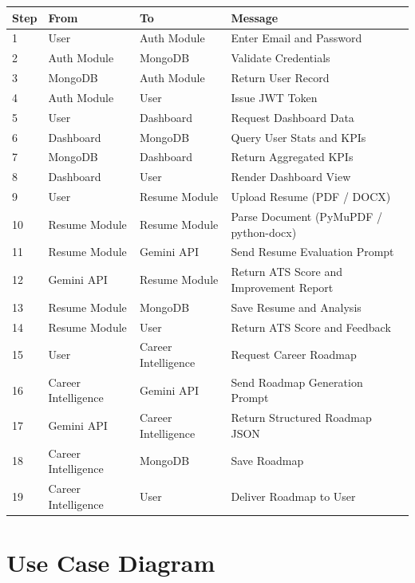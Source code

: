 \documentclass[12pt]{article}
\begin{document}
\begin{longtable}{|p{}|p{}|p{}|p{}|}
\hline
\textbf{Step} & \textbf{From} & \textbf{To} & \textbf{Message} \\ \hline
\endhead
1 & User & Auth Module & Enter Email and Password \\ \hline
2 & Auth Module & MongoDB & Validate Credentials \\ \hline
3 & MongoDB & Auth Module & Return User Record \\ \hline
4 & Auth Module & User & Issue JWT Token \\ \hline
5 & User & Dashboard & Request Dashboard Data \\ \hline
6 & Dashboard & MongoDB & Query User Stats and KPIs \\ \hline
7 & MongoDB & Dashboard & Return Aggregated KPIs \\ \hline
8 & Dashboard & User & Render Dashboard View \\ \hline
9 & User & Resume Module & Upload Resume (PDF / DOCX) \\ \hline
10 & Resume Module & Resume Module & Parse Document (PyMuPDF / python-docx) \\ \hline
11 & Resume Module & Gemini API & Send Resume Evaluation Prompt \\ \hline
12 & Gemini API & Resume Module & Return ATS Score and Improvement Report \\ \hline
13 & Resume Module & MongoDB & Save Resume and Analysis \\ \hline
14 & Resume Module & User & Return ATS Score and Feedback \\ \hline
15 & User & Career Intelligence & Request Career Roadmap \\ \hline
16 & Career Intelligence & Gemini API & Send Roadmap Generation Prompt \\ \hline
17 & Gemini API & Career Intelligence & Return Structured Roadmap JSON \\ \hline
18 & Career Intelligence & MongoDB & Save Roadmap \\ \hline
19 & Career Intelligence & User & Deliver Roadmap to User \\ \hline
\end{longtable}

\clearpage
\section{Use Case Diagram}
\end{document}
